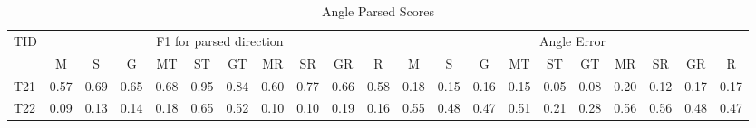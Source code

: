 \begin{table}
\caption{Angle Parsed Scores}
\label{tab:angle_parsed_scores}
\begin{tabular}{l|cccccccccc|cccccccccc}
\hline
\multirow{2}{*}{TID} & \multicolumn{10}{|c|}{F1 for parsed direction} & \multicolumn{10}{c}{Angle Error} \\
\cline{2-21}
\multicolumn{1}{l|}{} & M & S & G & MT & ST & GT & MR & SR & GR & R & M & S & G & MT & ST & GT & MR & SR & GR & R \\
\hline
T21 & 0.57 & 0.69 & 0.65 & 0.68 & 0.95 & 0.84 & 0.60 & 0.77 & 0.66 & 0.58 & 0.18 & 0.15 & 0.16 & 0.15 & 0.05 & 0.08 & 0.20 & 0.12 & 0.17 & 0.17 \\
T22 & 0.09 & 0.13 & 0.14 & 0.18 & 0.65 & 0.52 & 0.10 & 0.10 & 0.19 & 0.16 & 0.55 & 0.48 & 0.47 & 0.51 & 0.21 & 0.28 & 0.56 & 0.56 & 0.48 & 0.47 \\
\hline
\end{tabular}
\end{table}